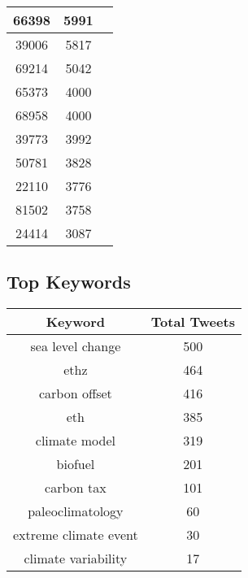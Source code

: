\documentclass{article}\usepackage[T1]{fontenc}
\begin{document}
\begin{tabular}{|c|c|c|}
 \hline
66398 & 5991\\ 
 \hline
39006 & 5817\\ 
 \hline
69214 & 5042\\ 
 \hline
65373 & 4000\\ 
 \hline
68958 & 4000\\ 
 \hline
39773 & 3992\\ 
 \hline
50781 & 3828\\ 
 \hline
22110 & 3776\\ 
 \hline
81502 & 3758\\ 
 \hline
24414 & 3087\\ 
 \hline
\end{tabular}\subsection*{Top Keywords}\begin{tabular}{|c|c|}         \hline         Keyword & Total Tweets \\ 
 \hline
sea level change & 500\\ 
 \hline
ethz & 464\\ 
 \hline
carbon offset & 416\\ 
 \hline
eth & 385\\ 
 \hline
climate model & 319\\ 
 \hline
biofuel & 201\\ 
 \hline
carbon tax & 101\\ 
 \hline
paleoclimatology & 60\\ 
 \hline
extreme climate event & 30\\ 
 \hline
climate variability & 17\\ 
 \hline
\end{tabular}
\end{document}
